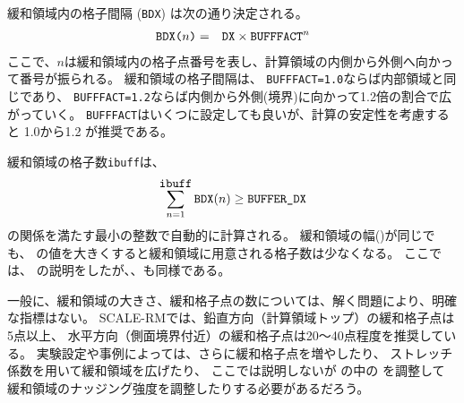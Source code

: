 緩和領域内の格子間隔 (\verb|BDX|) は次の通り決定される。
\begin{eqnarray}
 \verb|BDX(|n\verb|)| &=& \verb|DX| \times \verb|BUFFFACT|^n \nonumber
\end{eqnarray}
ここで、$n$は緩和領域内の格子点番号を表し、計算領域の内側から外側へ向かって番号が振られる。
緩和領域の格子間隔は、
\verb|BUFFFACT=1.0|ならば内部領域と同じであり、
\verb|BUFFFACT=1.2|ならば内側から外側(境界)に向かって1.2倍の割合で広がっていく。
\verb|BUFFFACT|はいくつに設定しても良いが、計算の安定性を考慮すると 1.0から1.2 が推奨である。

緩和領域の格子数\verb|ibuff|は、
\begin{eqnarray}
\sum_{n=1}^{\verb|ibuff|} \verb|BDX|(n) \ge \verb|BUFFER_DX| \nonumber
\end{eqnarray}
の関係を満たす最小の整数で自動的に計算される。
%
緩和領域の幅()が同じでも、
の値を大きくすると緩和領域に用意される格子数は少なくなる。
ここでは、{\XDIR} の説明をしたが、{\YDIR}、{\ZDIR}も同様である。


一般に、緩和領域の大きさ、緩和格子点の数については、解く問題により、明確な指標はない。
SCALE-RMでは、鉛直方向（計算領域トップ）の緩和格子点は5点以上、
水平方向（側面境界付近）の緩和格子点は20〜40点程度を推奨している。
実験設定や事例によっては、さらに緩和格子点を増やしたり、
ストレッチ係数を用いて緩和領域を広げたり、
ここでは説明しないが
の中の
を調整して
緩和領域のナッジング強度を調整したりする必要があるだろう。

